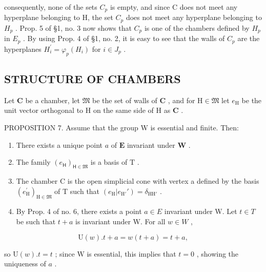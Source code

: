 consequently, none of the sets \(C_{p}\) is empty, and since C does not meet any hyperplane belonging to H, the set \(C_{p}\) does not meet any hyperplane belonging to \(H_{p}\) . Prop. 5 of §1, no. 3 now shows that \(C_{p}\) is one of the chambers defined by \(H_{p}\) in \(E_{p}\) . By using Prop. 4 of §1, no. 2, it is easy to see that the walls of \(C_{p}\) are the hyperplanes \(H_{i}^{\prime} = \varphi_{p}(H_{i})\) for \(i \in J_{p}\) .

\subsection{STRUCTURE OF CHAMBERS}

Let \(\mathbf{C}\) be a chamber, let \(\mathfrak{M}\) be the set of walls of \(\mathbf{C}\) , and for \(\mathrm{H} \in \mathfrak{M}\) let \(e_{\mathrm{H}}\) be the unit vector orthogonal to \(\mathrm{H}\) on the same side of \(\mathrm{H}\) as \(\mathbf{C}\) .

PROPOSITION 7. Assume that the group W is essential and finite. Then:

\begin{enumerate}
\def\labelenumi{(\roman{enumi})}
\item
  There exists a unique point \(a\) of \(\mathbf{E}\) invariant under \(\mathbf{W}\) .
\item
  The family \((e_{\mathsf{H}})_{\mathsf{H}\in \mathfrak{M}}\) is a basis of \(\mathrm{T}\) .
\item
  The chamber C is the open simplicial cone with vertex a defined by the basis \((e_{\mathrm{H}}^{\prime})_{\mathrm{H}\in \mathfrak{M}}\) of T such that \((e_{\mathrm{H}}|e_{\mathrm{H}'}') = \delta_{\mathrm{HH}'}\) .
\item
  By Prop. 4 of no. 6, there exists a point \(a \in E\) invariant under W. Let \(t \in T\) be such that \(t + a\) is invariant under W. For all \(w \in W\) ,
\end{enumerate}

\[
\mathrm{U} (w). t + a = w (t + a) = t + a,
\]

so \(\mathrm{U}(w).t = t\) ; since \(\mathrm{W}\) is essential, this implies that \(t = 0\) , showing the uniqueness of \(a\) .


